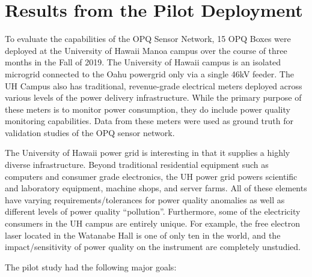\section{Results from the Pilot Deployment}
\label{sec:pilot-study}

To evaluate the capabilities of the OPQ Sensor Network, 15 OPQ Boxes were deployed at the University of Hawaii Manoa campus over the course of three months in the Fall of 2019.  The University of Hawaii campus is an isolated microgrid connected to the Oahu powergrid only via a single 46kV feeder. The UH Campus also has traditional, revenue-grade electrical meters deployed across various levels of the power delivery infrastructure. While the primary purpose of these meters is to monitor power consumption, they do include power quality monitoring capabilities. Data from these meters were used as ground truth for validation studies of the OPQ sensor network.

The University of Hawaii power grid is interesting in that it supplies a highly diverse infrastructure. Beyond traditional residential equipment such as computers and consumer grade electronics, the UH power grid powers scientific and laboratory equipment, machine shops, and server farms. All of these elements have varying requirements/tolerances for power quality anomalies as well as different levels of power quality “pollution”. Furthermore, some of the electricity consumers in the UH campus are entirely unique. For example, the free electron laser located in the Watanabe Hall is one of only ten in the world, and the impact/sensitivity of power quality on the instrument are completely unstudied.

The pilot study had the following major goals:

